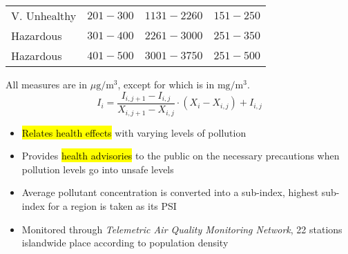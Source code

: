 \documentclass{article}
\begin{document}
\begin{multicols*}{4}
\begin{center}
\begin{tabular}{l|c|c|c}
    V. Unhealthy & $201-300$ & $1131-2260$    & $151-250$           \\
    Hazardous    & $301-400$ & $2261-3000$    & $251-350$           \\
    Hazardous    & $401-500$ & $3001-3750$    & $251-500$           \\
\end{tabular}\end{center}
All measures are in $\mu\mathrm{g/m^3}$, except for  which is in
$\mathrm{mg/m^3}$.
$$ I_i = 
    \frac{I_{i, j+1} - I_{i, j}}{X_{i, j+1} - X_{i, j}} 
    \cdot (X_i - X_{i,j})
    + I_{i, j} $$
\begin{itemize} \itemsep -0.5em
    \item \hl{Relates health effects} with varying levels of pollution
    \item Provides \hl{health advisories} to the public on the necessary precautions
        when pollution levels go into unsafe levels
    \item Average pollutant concentration is converted into a sub-index, highest
        sub-index for a region is taken as its PSI
    \item Monitored through \textit{Telemetric Air Quality Monitoring Network}, 22
        stations islandwide place according to population density
\end{itemize}


\end{multicols*}
\end{document}
